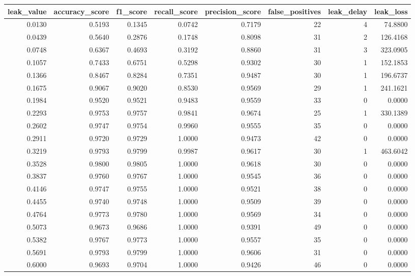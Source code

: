 \begin{tabular}{rrrrrrrr}
\toprule
leak\_value & accuracy\_score & f1\_score & recall\_score & precision\_score & false\_positives & leak\_delay & leak\_loss \\
\midrule
0.0130 & 0.5193 & 0.1345 & 0.0742 & 0.7179 & 22 & 4 & 74.8800 \\
0.0439 & 0.5640 & 0.2876 & 0.1748 & 0.8098 & 31 & 2 & 126.4168 \\
0.0748 & 0.6367 & 0.4693 & 0.3192 & 0.8860 & 31 & 3 & 323.0905 \\
0.1057 & 0.7433 & 0.6751 & 0.5298 & 0.9302 & 30 & 1 & 152.1853 \\
0.1366 & 0.8467 & 0.8284 & 0.7351 & 0.9487 & 30 & 1 & 196.6737 \\
0.1675 & 0.9067 & 0.9020 & 0.8530 & 0.9569 & 29 & 1 & 241.1621 \\
0.1984 & 0.9520 & 0.9521 & 0.9483 & 0.9559 & 33 & 0 & 0.0000 \\
0.2293 & 0.9753 & 0.9757 & 0.9841 & 0.9674 & 25 & 1 & 330.1389 \\
0.2602 & 0.9747 & 0.9754 & 0.9960 & 0.9555 & 35 & 0 & 0.0000 \\
0.2911 & 0.9720 & 0.9729 & 1.0000 & 0.9473 & 42 & 0 & 0.0000 \\
0.3219 & 0.9793 & 0.9799 & 0.9987 & 0.9617 & 30 & 1 & 463.6042 \\
0.3528 & 0.9800 & 0.9805 & 1.0000 & 0.9618 & 30 & 0 & 0.0000 \\
0.3837 & 0.9760 & 0.9767 & 1.0000 & 0.9545 & 36 & 0 & 0.0000 \\
0.4146 & 0.9747 & 0.9755 & 1.0000 & 0.9521 & 38 & 0 & 0.0000 \\
0.4455 & 0.9740 & 0.9748 & 1.0000 & 0.9509 & 39 & 0 & 0.0000 \\
0.4764 & 0.9773 & 0.9780 & 1.0000 & 0.9569 & 34 & 0 & 0.0000 \\
0.5073 & 0.9673 & 0.9686 & 1.0000 & 0.9391 & 49 & 0 & 0.0000 \\
0.5382 & 0.9767 & 0.9773 & 1.0000 & 0.9557 & 35 & 0 & 0.0000 \\
0.5691 & 0.9793 & 0.9799 & 1.0000 & 0.9606 & 31 & 0 & 0.0000 \\
0.6000 & 0.9693 & 0.9704 & 1.0000 & 0.9426 & 46 & 0 & 0.0000 \\
\bottomrule
\end{tabular}
